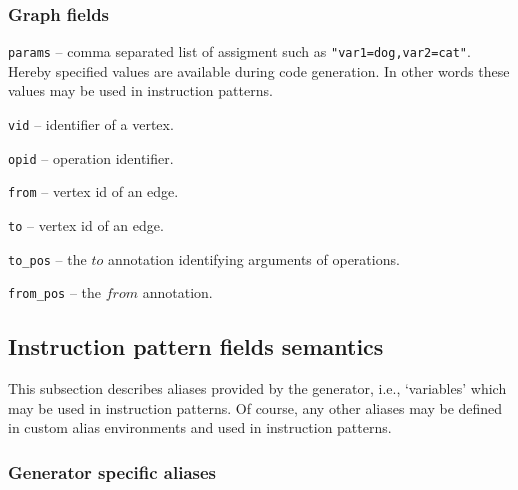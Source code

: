 \subsubsection{Graph fields}
\begin{description}
\item\texttt{params} -- comma separated list of assigment such as \texttt{"var1=dog,var2=cat"}. Hereby specified values are available during code generation. In other words these values may be used in instruction patterns.
\item\texttt{vid} -- identifier of a vertex.
\item\texttt{opid} -- operation identifier.
\item\texttt{from} -- vertex id of an edge.
\item\texttt{to} -- vertex id of an edge.
\item\texttt{to\_pos} -- the $to$ annotation identifying arguments of operations.
\item\texttt{from\_pos} -- the $from$ annotation.
\end{description}

\subsection{Instruction pattern fields semantics}

This subsection describes aliases provided by the generator, i.e., `variables' which may be used in instruction patterns. Of course, any other aliases may be defined in custom alias environments and used in instruction patterns.


\subsubsection{Generator specific aliases}

